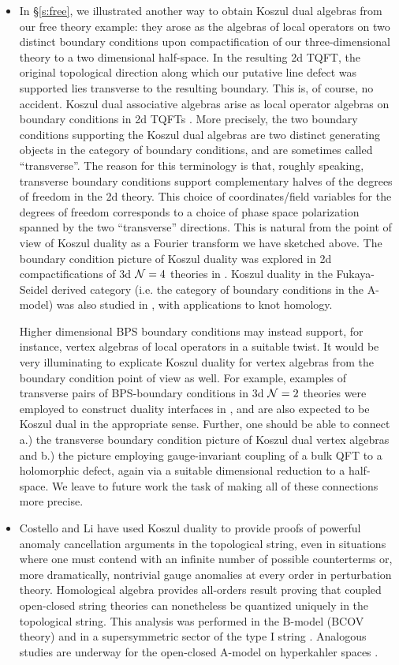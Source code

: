 \documentclass[11pt]{amsart}
\begin{document}
\begin{itemize}
\item In \S \ref{s:free}, we illustrated another way to obtain Koszul dual algebras from our free theory example: they arose as the algebras of local operators on two distinct boundary conditions upon compactification of our three-dimensional theory to a two dimensional half-space. In the resulting 2d TQFT, the original topological direction along which our putative line defect was supported lies transverse to the resulting boundary. This is, of course, no accident. Koszul dual associative algebras arise as local operator algebras on boundary conditions in 2d TQFTs \cite{DimofteStringMath}. More precisely, the two boundary conditions supporting the Koszul dual algebras are two distinct generating objects in the category of boundary conditions, and are sometimes called ``transverse''. The reason for this terminology is that, roughly speaking, transverse boundary conditions support complementary halves of the degrees of freedom in the 2d theory. This choice of coordinates/field variables for the degrees of freedom corresponds to a choice of phase space polarization spanned by the two ``transverse'' directions. This is natural from the point of view of Koszul duality as a Fourier transform we have sketched above. The boundary condition picture of Koszul duality was explored in 2d compactifications of 3d $\mathcal N =4$ theories in \cite{BDGH}. Koszul duality in the Fukaya-Seidel derived category (i.e. the category of boundary conditions in the A-model) was also studied in \cite{Mina}, with applications to knot homology. 

Higher dimensional BPS boundary conditions may instead support, for instance, vertex algebras of local operators in a suitable twist. It would be very illuminating to explicate Koszul duality for vertex algebras from the boundary condition point of view as well. For example, examples of transverse pairs of BPS-boundary conditions in 3d $\mathcal N=2$ theories were employed to construct duality interfaces in \cite{DGP}, and are also expected to be Koszul dual in the appropriate sense. Further, one should be able to connect a.) the transverse boundary condition picture of Koszul dual vertex algebras and b.) the picture employing gauge-invariant coupling of a bulk QFT to a holomorphic defect, again via a suitable dimensional reduction to a half-space. We leave to future work the task of making all of these connections more precise.\\

\item Costello and Li have used Koszul duality to provide proofs of powerful anomaly cancellation arguments in the topological string, even in situations where one must contend with an infinite number of possible counterterms or, more dramatically, nontrivial gauge anomalies at every order in perturbation theory. Homological algebra provides all-orders result proving that coupled open-closed string theories can nonetheless be quantized uniquely in the topological string. This analysis was performed in the B-model (BCOV theory) \cite{CLBCOV} and in a supersymmetric sector of the type I string \cite{CL2}. Analogous studies are underway for the open-closed A-model on hyperkahler spaces \cite{PS}. \\


\end{itemize}
\end{document}
